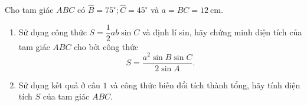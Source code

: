 \begin{bt}%
	Cho tam giác $A B C$ có $\widehat{B}=75^{\circ}; \widehat{C}=45^{\circ}$ và $a=B C=12 \mathrm{~cm}$.
	\begin{enumerate}
		\item Sử dụng công thức $S=\dfrac{1}{2} a b \sin C$ và định lí sin, hãy chứng minh diện tích của tam giác $A B C$ cho bởi công thức
		      $$
			      S=\dfrac{a^2 \sin B \sin C}{2 \sin A} .
		      $$
		\item Sử dụng kết quả ở câu $1$ và công thức biến đổi tích thành tổng, hãy tính diện tích $S$ của tam giác $A B C$.
	\end{enumerate}
\end{bt}

